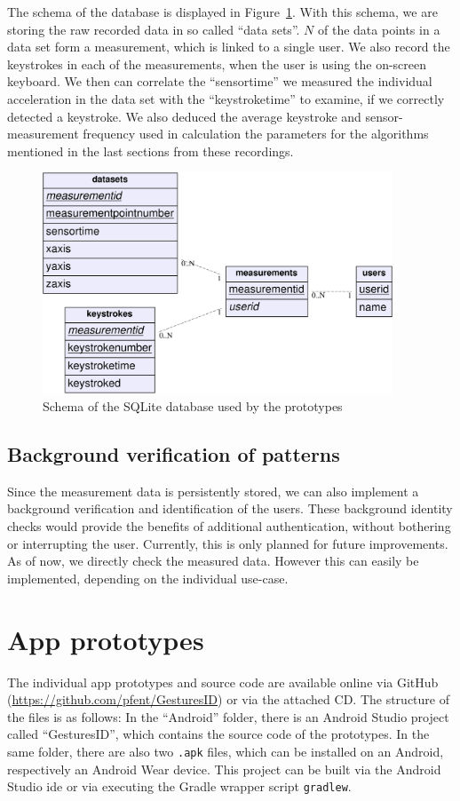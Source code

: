 The schema of the database is displayed in Figure~\ref{fig:dbschema}. With this schema, we are  storing the raw recorded data in so called ``data sets''. $N$ of the data points in a data set form a measurement, which is linked to a single user. We also record the keystrokes in each of the measurements, when the user is using the on-screen keyboard. We then can correlate the ``sensortime'' we measured the individual acceleration in the data set with the ``keystroketime'' to examine, if we correctly detected a keystroke. We also deduced the average keystroke and sensor-measurement frequency used in calculation the parameters for the algorithms mentioned in the last sections from these recordings.
\begin{figure}
    \centering
    \includegraphics[width=0.93\textwidth]{figures/databaseschema.png}
    \caption{Schema of the SQLite database used by the prototypes}
    \label{fig:dbschema}
\end{figure}

\subsection{Background verification of patterns}
Since the measurement data is persistently stored, we can also implement a background verification and identification of the users. These background identity checks would provide the benefits of additional authentication, without bothering or interrupting the user.
Currently, this is only planned for future improvements. As of now, we directly check the measured data. However this can easily be implemented, depending on the individual use-case.
\section{App prototypes}
The individual app prototypes and source code are available online via GitHub (\url{https://github.com/pfent/GesturesID}) or via the attached CD. The structure of the files is as follows: In the ``Android'' folder, there is an Android Studio project called ``GesturesID'', which contains the source code of the prototypes. In the same folder, there are also two \lstinline$.apk$ files, which can be installed on an Android, respectively an Android Wear device. This project can be built via the Android Studio \gls{ide} or via executing the Gradle wrapper script \lstinline$gradlew$.

